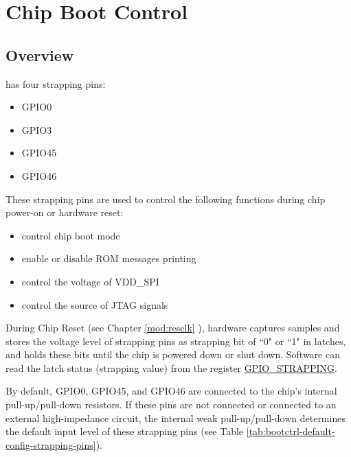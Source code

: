 \documentclass[main\_\_EN.tex]{subfiles}
\begin{document}

\ifglobal
\else
    {\let\clearpage\relax \listoftodos}
    \tableofcontents
\fi


\hypertarget{bootctrl}{}
\chapter{Chip Boot Control}
\label{mod:bootctrl}

\section{Overview}

\chipname{} has four strapping pins:
\begin{itemize}
    \item GPIO0
    \item GPIO3
    \item GPIO45
    \item GPIO46
\end{itemize}
These strapping pins are used to control the following functions during chip power-on or hardware reset:
\begin{itemize}
    \item control chip boot mode
    \item enable or disable ROM messages printing
    \item control the voltage of VDD\_SPI
    \item control the source of JTAG signals
\end{itemize}

During Chip Reset (see Chapter \ref{mod:resclk} \textit{}), hardware captures samples and stores the voltage level of strapping pins as strapping bit of ``0" or ``1" in latches, and holds these bits until the chip is powered down or shut down. Software can read the latch status (strapping value) from the register \hyperref[fielddesc:GPIOSTRAPPING]{GPIO\_STRAPPING}.

By default, GPIO0, GPIO45, and GPIO46 are connected to the chip's internal pull-up/pull-down resistors. If these pins are not connected or connected to an external high-impedance circuit, the internal weak pull-up/pull-down determines the default input level of these strapping pins (see Table \ref{tab:bootctrl-default-config-strapping-pins}).
\end{document}
